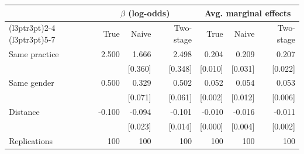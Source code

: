 
\begin{tabular}{lrrrrrr}
\toprule
\multicolumn{1}{c}{ } & \multicolumn{3}{c}{$\beta$ (log-odds)} & \multicolumn{3}{c}{Avg. marginal effects} \\
\cmidrule(l{3pt}r{3pt}){2-4} \cmidrule(l{3pt}r{3pt}){5-7}
 & True & Naive & Two-stage & True & Naive & Two-stage\\
\midrule
Same practice & 2.500 & 1.666 & 2.498 & 0.204 & 0.209 & 0.207\\
 &  & {}[0.360] & {}[0.348] & {}[0.010] & {}[0.031] & {}[0.022]\\
Same gender & 0.500 & 0.329 & 0.502 & 0.052 & 0.054 & 0.053\\
 &  & {}[0.071] & {}[0.061] & {}[0.002] & {}[0.012] & {}[0.006]\\
Distance & -0.100 & -0.094 & -0.101 & -0.010 & -0.016 & -0.011\\
 &  & {}[0.023] & {}[0.014] & {}[0.000] & {}[0.004] & {}[0.002]\\
Replications & 100 & 100 & 100 & 100 & 100 & 100\\
\bottomrule
\end{tabular}
